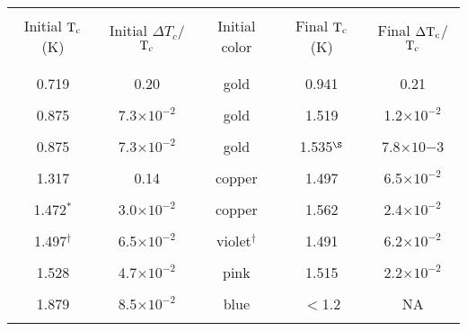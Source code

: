 {\newpage
\clearpage
\samepage \begin{table}\begin{center}

\vspace{0.5in}
\label{hydtctable}
\begin{tabular}{|ccccc|}
\hline
& & & & \\ 
Initial $\rm T_c$ (K) & Initial $\Delta T_c$/$\rm T_c$ & Initial color &
Final $\rm T_c$ (K) & Final $\rm \Delta T_c$/$\rm T_c$ \\ 
& & & & \\ 
\hline
& & & & \\ 
0.719 & 0.20 & gold & 0.941 & 0.21\\  	%
& & & & \\ 
0.875 & 7.3$\times 10^{-2}$ & gold & 1.519 & 1.2$\times 10^{-2}$\\  %
& & & & \\ 
0.875 & 7.3$\times 10^{-2}$ & gold & 1.535$^{\S}$	& 7.8$\times 10{-3}$\\  %
& & & & \\ 
1.317 & 0.14& copper & 1.497 & 6.5$\times 10^{-2}$\\ 	%
& & & & \\ 
1.472$^{\ast}$ & 3.0$\times 10^{-2}$ & copper & 1.562 & 2.4$\times 10^{-2}$\\  %
& & & & \\ 
1.497$^{\dagger}$ & 6.5$\times 10^{-2}$ & violet$^{\dagger}$ & 1.491 & 6.2$\times 10^{-2}$\\  %
& & & & \\ 
1.528 & 4.7$\times 10^{-2}$ & pink & 1.515 & 2.2$\times 10^{-2}$ \\  %
& & & & \\ 
1.879 & 8.5$\times 10^{-2}$ & blue & $<$1.2 & NA \\  %
& & & & \\ 
\hline
\end{tabular}
\end{center}
\end{table}
}

{\newpage
\clearpage
\samepage \begin{figure}\vspace{20cm}

\label{hydeffect}
\end{figure}
}

{\newpage
\clearpage
\samepage \begin{figure}\vspace{20cm}

\label{stitcvsP}
\end{figure}
}

